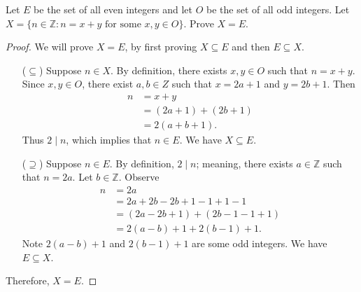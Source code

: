 \documentclass{article}
\newcommand{\Z}{\mathbb{Z}}
\theoremstyle{definition}
\begin{document}
\begin{question}
   Let $E$ be the set of all even integers and let $O$ be the set of all odd integers. Let $X=\{ n\in \Z : n = x+y \text{ for some } x, y\in O\}$. Prove $X=E$.
\end{question}
\begin{solution}
\begin{proof}
We will prove $X=E$, by first proving $X \subseteq E$ and then $E\subseteq X$.
\begin{enumerate}
\item[($\subseteq$)] Suppose $n\in X$. By definition, there exists $x, y \in O$ such that $n= x+y$. Since $x, y\in O$, there exist $a, b\in Z$ such that $x=2a+1$ and $y=2b+1$. Then
\begin{align*}
n &= x+ y \\
&= (2a+1) + (2b+1)\\
& = 2(a+b+1).
\end{align*}
Thus $2 \mid n$, which implies that $n\in E$. We have $X\subseteq E$.

\item [($\supseteq$)] Suppose $n\in E$. By definition, $2 \mid n$; meaning, there exists $a\in \Z$ such that $n=2a$. Let $b\in \Z$. Observe
\begin{align*}
n &= 2a\\
&= 2a + 2b - 2b + 1 -1 + 1 -1\\
& = (2a - 2b +1) + (2b -1 -1 + 1)\\
& = 2(a-b) + 1 + 2(b-1) + 1.
\end{align*}
Note $2(a-b) + 1$ and  $2(b-1) + 1$ are some odd integers. We have $E\subseteq X$.
\end{enumerate}
Therefore, $X=E$.
\end{proof}
\end{solution}
\end{document}
